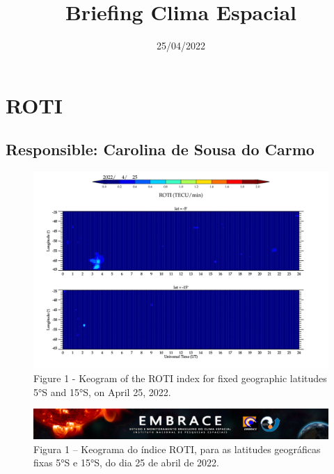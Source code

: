 \documentclass[11pt, oneside]{article}
\title{Briefing Clima Espacial}
\date{25/04/2022}
\begin{document}
\maketitle 

 \section{ROTI} 
 \subsection{Responsible: Carolina de Sousa do Carmo} 
 
\begin{figure}[H]
    
                        \centering
   
                             \includegraphics[width=14cm]{./figures/figureRadBelts_1.png}

                             \caption{Figure 1 - Keogram of the ROTI index for fixed geographic latitudes 5°S and 15°S, on April 25, 2022.}
                        \end{figure}

                     \begin{figure}[H]
    
                        \centering
   
                             \includegraphics[width=14cm]{./figures/figureRadBelts_2.png}

                             \caption{Figura 1 – Keograma do índice ROTI, para as latitudes geográficas fixas 5°S e 15°S, do dia 25 de abril de 2022.}
                        \end{figure}
\end{document}
